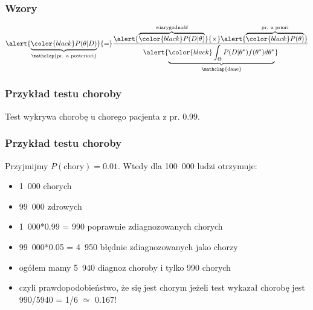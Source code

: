 \documentclass{beamer}
\begin{document}
\begin{frame}
	\frametitle{
	Wzory}

\[
  \alert{\underbrace{\color{black}P(\theta|D)}_
    {\mathclap{\text{pr. a posteriori}}}}
  {=}
  \frac{\alert{\overbrace{\color{black}P(D|\theta)}^
      {\text{wiarygodność}}}
  {\times}
  \alert{\overbrace{\color{black}P(\theta)}^
    {\text{pr. a priori}}}}{\alert{\underbrace{\color{black}\int_{\Theta}P(D|\theta^*)f(\theta^*)d\theta^*}_
        {\mathclap{\text{dane}}}}}
\]
\end{frame}

\begin{frame}
\frametitle{
Przykład testu choroby}

Test wykrywa chorobę u chorego pacjenta z pr. 0.99. 





\end{frame}

\begin{frame}
\frametitle{
Przykład testu choroby}

Przyjmijmy $P(\text{chory})=0.01$. Wtedy dla 100~000 ludzi otrzymuje:
\begin{itemize}
\item 1~000 chorych
\item 99~000 zdrowych
\item 1~000*0.99 = 990 poprawnie zdiagnozowanych chorych
\item 99~000*0.05 = 4~950 błędnie zdiagnozowanych jako chorzy
\item ogółem mamy 5~940 diagnoz choroby i tylko 990 chorych
\item czyli prawdopodobieństwo, że się jest chorym jeżeli test wykazał chorobę jest 990/5940 = 1/6 $\simeq$ 0.167!
\end{itemize}

\end{frame}
\end{document}
